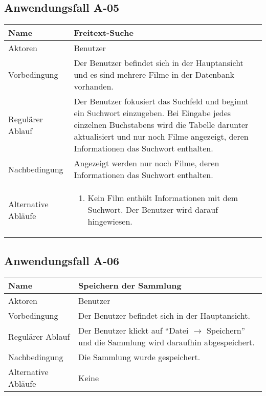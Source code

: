 \documentclass[oneside,german,oneside]{scrbook}
\begin{document}
    \subsection{Anwendungsfall A-05}\label{uc:05}

      \begin{tabular}{|b|p{10cm}|}
        \hline
        Name & Freitext-Suche \\
        \hline
        Aktoren & Benutzer \\
        \hline
        \hline
        Vorbedingung & Der Benutzer befindet sich in der Hauptansicht und es
        sind mehrere Filme in der Datenbank vorhanden.\\
        \hline
        Regul\"arer Ablauf & Der Benutzer fokusiert das Suchfeld und beginnt ein
        Suchwort einzugeben. Bei Eingabe jedes einzelnen Buchstabens wird die
        Tabelle darunter aktualisiert und nur noch Filme angezeigt, deren
        Informationen das Suchwort enthalten.\\
        \hline
        Nachbedingung & Angezeigt werden nur noch Filme, deren Informationen
        das Suchwort enthalten.\\
        \hline
        Alternative Abl\"aufe &
        \begin{enumerate}
          \item Kein Film enth\"alt Informationen mit dem Suchwort. Der Benutzer
          wird darauf hingewiesen.
        \end{enumerate}\\
        \hline
      \end{tabular}

    \subsection{Anwendungsfall A-06}\label{uc:06}

      \begin{tabular}{|b|p{10cm}|}
        \hline
        Name & Speichern der Sammlung \\
        \hline
        Aktoren & Benutzer \\
        \hline
        \hline
        Vorbedingung & Der Benutzer befindet sich in der Hauptansicht.\\
        \hline
        Regul\"arer Ablauf & Der Benutzer klickt auf ``Datei $\rightarrow$ Speichern'' und
        die Sammlung wird daraufhin abgespeichert.\\
        \hline
        Nachbedingung & Die Sammlung wurde gespeichert.\\
        \hline
        Alternative Abl\"aufe & Keine \\
        \hline
      \end{tabular}
\end{document}
